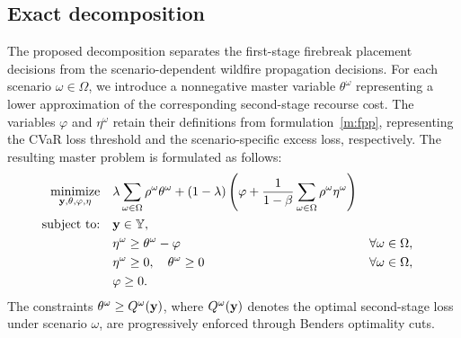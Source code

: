 \documentclass[a4paper,fleqn]{cas-sc}
\begin{document}
\subsection{Exact decomposition}
\label{subsec:exact_decomposition}

The proposed decomposition separates the first-stage firebreak placement decisions from the scenario-dependent wildfire propagation decisions. For each scenario $\omega \in \Omega$, we introduce a nonnegative master variable $\theta^\omega$ representing a lower approximation of the corresponding second-stage recourse cost. The variables $\varphi$ and $\eta^\omega$ retain their definitions from formulation~\eqref{m:fpp}, representing the CVaR loss threshold and the scenario-specific excess loss, respectively. The resulting master problem is formulated as follows:
%
\begin{equation}
\label{m:fpp_bd}
\begin{aligned}
\underset{\vb{y},\vb{\theta},\varphi,\vb{\eta}}{\text{minimize}}
\quad &
\lambda \sum_{\omega \in \Omega} \rho^\omega \theta^\omega
+ (1-\lambda)
\left(
\varphi + \frac{1}{1-\beta}
\sum_{\omega \in \Omega} \rho^\omega \eta^\omega
\right)\\
\text{subject to:}\quad
& \vb{y} \in \mathbb{Y},\\
& \eta^\omega \geq \theta^\omega - \varphi
&& \forall \omega \in \Omega,\\
& \eta^\omega \geq 0,\quad \theta^\omega \geq 0
&& \forall \omega \in \Omega,\\
& \varphi \geq 0.
\end{aligned}
\end{equation}
%
The constraints $\theta^\omega \geq Q^\omega(\vb{y})$, where $Q^\omega(\vb{y})$ denotes the optimal second-stage loss under scenario $\omega$, are progressively enforced through Benders optimality cuts.
\end{document}
